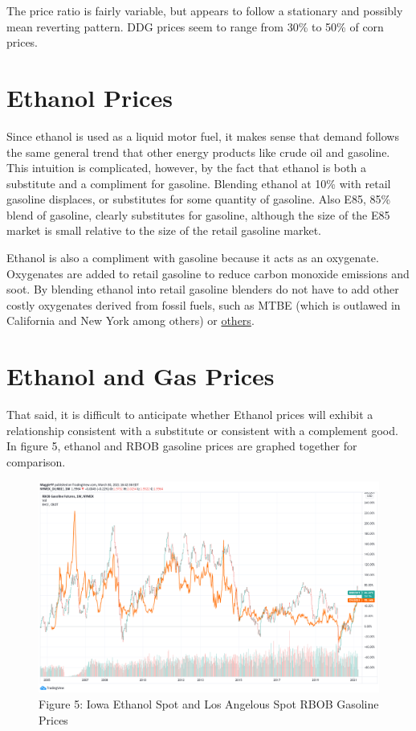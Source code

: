 \documentclass[
  letterpaper,
  DIV=11,
  numbers=noendperiod]{scrreprt}
\begin{document}
The price ratio is fairly variable, but appears to follow a stationary
and possibly mean reverting pattern. DDG prices seem to range from 30\%
to 50\% of corn prices.

\hypertarget{ethanol-prices}{%
\section{Ethanol Prices}\label{ethanol-prices}}

Since ethanol is used as a liquid motor fuel, it makes sense that demand
follows the same general trend that other energy products like crude oil
and gasoline. This intuition is complicated, however, by the fact that
ethanol is both a substitute and a compliment for gasoline. Blending
ethanol at 10\% with retail gasoline displaces, or substitutes for some
quantity of gasoline. Also E85, 85\% blend of gasoline, clearly
substitutes for gasoline, although the size of the E85 market is small
relative to the size of the retail gasoline market.

Ethanol is also a compliment with gasoline because it acts as an
oxygenate. Oxygenates are added to retail gasoline to reduce carbon
monoxide emissions and soot. By blending ethanol into retail gasoline
blenders do not have to add other costly oxygenates derived from fossil
fuels, such as MTBE (which is outlawed in California and New York among
others) or \href{https://en.wikipedia.org/wiki/Oxygenate}{others}.

\hypertarget{ethanol-and-gas-prices}{%
\section{Ethanol and Gas Prices}\label{ethanol-and-gas-prices}}

That said, it is difficult to anticipate whether Ethanol prices will
exhibit a relationship consistent with a substitute or consistent with a
complement good. In figure 5, ethanol and RBOB gasoline prices are
graphed together for comparison.

\begin{figure}

{\centering \includegraphics{assets/EthRBOB.png}

}

\caption{Figure 5: Iowa Ethanol Spot and Los Angelous Spot RBOB Gasoline
Prices}

\end{figure}
\end{document}
